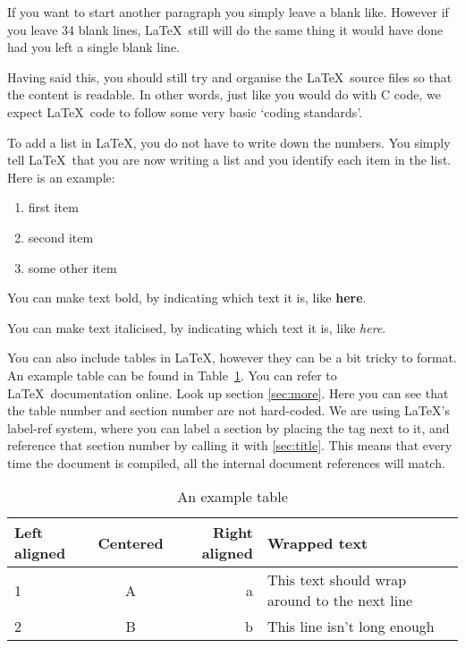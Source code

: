 If you want to start another paragraph you simply leave a blank
like. However if you leave 34 blank lines, \LaTeX~still will do the
same thing it would have done had you left a single blank line.

Having said this, you should still try and organise the \LaTeX~source
files so that the content is readable. In other words, just like you
would do with C code, we expect \LaTeX~code to follow some very basic
`coding standards'.

To add a list in \LaTeX, you do not have to write down the
numbers. You simply tell \LaTeX~that you are now writing a list and
you identify each item in the list. Here is an example:


\begin{enumerate}
	\item first item
	\item second item
	\item some other item
\end{enumerate}

You can make text bold, by indicating which text it is, like
\textbf{here}. 

You can make text italicised, by indicating which text it is, like \textit{here}. 

You can also include tables in \LaTeX, however they can be a bit
tricky to format. An example table can be found in
Table~\ref{tab:example-table}. You can refer to \LaTeX~documentation
online. Look up section \ref{sec:more}. Here you can see that the
table number and section number are not hard-coded. We are using
\LaTeX's label-ref system, where you can label a section by placing
the \label{sec:title} tag next to it, and reference that section
number by calling it with \ref{sec:title}. This means that every time
the document is compiled, all the internal document references will
match.

\begin{table}[t]
\centering
\begin{tabular}{|l|c|r|p{5cm}|}
\hline
  \textbf{Left aligned} & \textbf{Centered} & \textbf{Right aligned} &
  \textbf{Wrapped text}\\
\hline
\hline
  1 & A & a & This text should wrap around to the next line\\
  2 & B & b & This line isn't long enough\\
\hline
\end{tabular}
\caption{An example table}
\label{tab:example-table}
\end{table}

